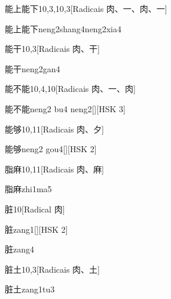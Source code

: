 \begin{entry}{能上能下}{10,3,10,3}[Radicais ⾁、⼀、⾁、⼀]
  \begin{phonetics}{能上能下}{neng2shang4neng2xia4}
  \end{phonetics}
\end{entry}

\begin{entry}{能干}{10,3}[Radicais ⾁、⼲]
  \begin{phonetics}{能干}{neng2gan4}
  \end{phonetics}
\end{entry}

\begin{entry}{能不能}{10,4,10}[Radicais ⾁、⼀、⾁]
  \begin{phonetics}{能不能}{neng2 bu4 neng2}[][HSK 3]
  \end{phonetics}
\end{entry}

\begin{entry}{能够}{10,11}[Radicais ⾁、⼣]
  \begin{phonetics}{能够}{neng2 gou4}[][HSK 2]
  \end{phonetics}
\end{entry}

\begin{entry}{脂麻}{10,11}[Radicais ⾁、⿇]
  \begin{phonetics}{脂麻}{zhi1ma5}
  \end{phonetics}
\end{entry}

\begin{entry}{脏}{10}[Radical ⾁]
  \begin{phonetics}{脏}{zang1}[][HSK 2]
  \end{phonetics}
  \begin{phonetics}{脏}{zang4}
  \end{phonetics}
\end{entry}

\begin{entry}{脏土}{10,3}[Radicais ⾁、⼟]
  \begin{phonetics}{脏土}{zang1tu3}
  \end{phonetics}
\end{entry}

